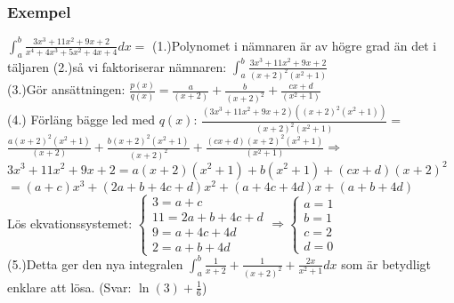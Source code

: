 \documentclass{article}
\begin{document}
\subsubsection{Exempel}
${\displaystyle \int_{a}^{b}\frac{3x^3+11x^2+9x+2}{x^4+4x^3+5x^2+4x+4}dx
=}$ (1.)Polynomet i nämnaren är av högre grad än det i täljaren (2.)så vi faktoriserar nämnaren:
${\displaystyle \int_{a}^{b}\frac{3x^3+11x^2+9x+2}{(x+2)^2(x^2+1)}}$\\
(3.)Gör ansättningen: ${\displaystyle \frac{p(x)}{q(x)}
= \frac{a}{(x+2)}+\frac{b}{(x+2)^2}+\frac{cx+d}{(x^2+1)}}$     \\
(4.) Förläng bägge led med $q(x)$: ${\displaystyle \frac{(3x^3+11x^2+9x+2)((x+2)^2(x^2+1))}{(x+2)^2(x^2+1)} = }$  \\ ${\displaystyle\frac{a(x+2)^2(x^2+1)}{(x+2)}+\frac{b(x+2)^2(x^2+1)}{(x+2)^2}+\frac{(cx+d)(x+2)^2(x^2+1)}{(x^2+1)} \Rightarrow  }$              \\
${\displaystyle 3x^3+11x^2+9x+2 = a(x+2)(x^2+1)+b(x^2+1)+(cx+d)(x+2)^2}$                                                 \\
${\displaystyle = (a+c)x^3+(2a+b+4c+d)x^2+(a+4c+4d)x+(a+b+4d)}$\\
Lös ekvationssystemet: ${\displaystyle \left\{
\begin{array}{l}
    3 = a+c        \\
    11= 2a+b+4c+d  \\
    9 = a+4c+4d    \\
    2 = a+b+4d
\end{array}
\right. \Rightarrow \left\{
\begin{array}{l}
    a = 1   \\
    b = 1   \\
    c = 2   \\
    d = 0
\end{array}
\right.}$\\
(5.)Detta ger den nya integralen ${\displaystyle \int_{a}^{b}\frac{1}{x+2}+\frac{1}{(x+2)^2}+\frac{2x}{x^2+1}dx  }$ som är betydligt enklare att lösa. (Svar: $\ln(3)+\frac{1}{6}$)
\end{document}
